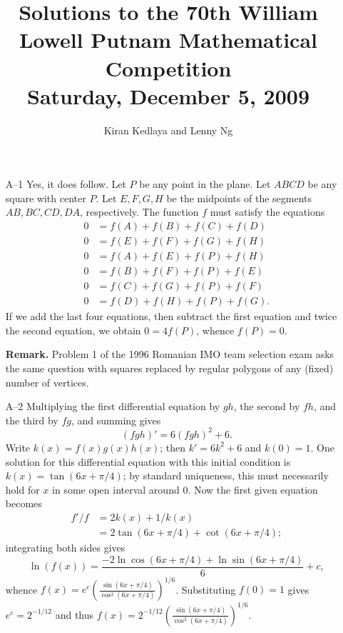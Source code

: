 \documentclass[amssymb,twocolumn,pra,10pt,aps]{revtex4-1}
\begin{document}
\title{Solutions to the 70th William Lowell Putnam Mathematical Competition \\
    Saturday, December 5, 2009}
\author{Kiran Kedlaya and Lenny Ng}
\noaffiliation
\maketitle

\begin{itemize}

\item[A--1]
Yes, it does follow. Let $P$ be any point in the plane. Let $ABCD$ be any square with center $P$.
Let $E,F,G,H$ be the midpoints of the segments $AB, BC, CD, DA$, respectively. The function
$f$ must satisfy the equations
\begin{align*}
0 &= f(A) + f(B) + f(C) + f(D) \\
0 &= f(E) + f(F) + f(G) + f(H) \\
0 &= f(A) + f(E) + f(P) + f(H) \\
0 &= f(B) + f(F) + f(P) + f(E) \\
0 &= f(C) + f(G) + f(P) + f(F) \\
0 &= f(D) + f(H) + f(P) + f(G).
\end{align*}
If we add the last four equations, then subtract the first equation and twice the second equation,
we obtain $0 = 4f(P)$, whence $f(P) = 0$.

\textbf{Remark.} Problem 1 of the 1996 Romanian IMO team selection exam asks the same
question with squares replaced by regular polygons of any (fixed) number of vertices.

\item[A--2]
Multiplying the first differential equation by $gh$, the second by $fh$,
and the third by $fg$, and summing gives
\[
(fgh)' = 6(fgh)^2+6.
\]
Write $k(x) = f(x)g(x)h(x)$; then $k' = 6k^2+6$ and $k(0) = 1$. One
solution for this differential equation with this initial condition is
$k(x) = \tan(6x+\pi/4)$; by standard uniqueness, this must necessarily
hold for $x$ in some open interval around $0$. Now the first given
equation becomes
\begin{align*}
f'/f &= 2k(x)+1/k(x) \\
&= 2\tan(6x+\pi/4)+\cot(6x+\pi/4);
\end{align*}
integrating both sides gives
\[
\ln(f(x)) = \frac{-2\ln\cos(6x+\pi/4) + \ln\sin(6x+\pi/4)}{6}+c,
\]
whence $f(x) = e^c
\left(\frac{\sin(6x+\pi/4)}{\cos^2(6x+\pi/4)}\right)^{1/6}$.
Substituting $f(0)=1$ gives $e^c = 2^{-1/12}$ and thus $f(x) = 2^{-1/12}
\left(\frac{\sin(6x+\pi/4)}{\cos^2(6x+\pi/4)}\right)^{1/6}$.


\end{itemize}
\end{document}

